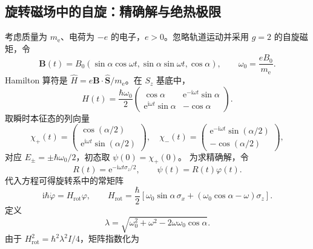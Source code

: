 \subsection{旋转磁场中的自旋：精确解与绝热极限}
考虑质量为 $m_{\mathrm e}$、电荷为 $-e$ 的电子，$e>0$。忽略轨道运动并采用 $g=2$ 的自旋磁矩，令
\begin{equation}
\bm B\left(t\right)=B_0\left(\sin\alpha\cos\omega t,\sin\alpha\sin\omega t,\cos\alpha\right),\qquad
\omega_0=\frac{eB_0}{m_{\mathrm e}}.
\end{equation}
Hamilton 算符是 $\hat H=e\bm B\cdot\hat{\bm S}/m_{\mathrm e}$。在 $S_z$ 基底中，
\begin{equation}
H\left(t\right)=\frac{\hbar\omega_0}{2}
\left(\begin{matrix}\cos\alpha&\mathrm{e}^{-\mathrm{i}\omega t}\sin\alpha\\
\mathrm{e}^{\mathrm{i}\omega t}\sin\alpha&-\cos\alpha\end{matrix}\right).
\end{equation}
取瞬时本征态的列向量
\begin{equation}
\chi_+\left(t\right)=\left(\begin{matrix}\cos\left(\alpha/2\right)\\
\mathrm{e}^{\mathrm{i}\omega t}\sin\left(\alpha/2\right)\end{matrix}\right),\quad
\chi_-\left(t\right)=\left(\begin{matrix}\mathrm{e}^{-\mathrm{i}\omega t}\sin\left(\alpha/2\right)\\
-\cos\left(\alpha/2\right)\end{matrix}\right),
\end{equation}
对应 $E_\pm=\pm\hbar\omega_0/2$，初态取 $\psi\left(0\right)=\chi_+\left(0\right)$。
为求精确解，令
\begin{equation}
R\left(t\right)=\mathrm{e}^{-\mathrm{i}\omega t\sigma_z/2},\qquad
\psi\left(t\right)=R\left(t\right)\varphi\left(t\right).
\end{equation}
代入方程可得旋转系中的常矩阵
\begin{equation}
\mathrm{i}\hbar\dot\varphi=H_{\mathrm{rot}}\varphi,\qquad
H_{\mathrm{rot}}=\frac\hbar2\left[\omega_0\sin\alpha\,\sigma_x+
\left(\omega_0\cos\alpha-\omega\right)\sigma_z\right].
\end{equation}
定义
\begin{equation}
\lambda=\sqrt{\omega_0^2+\omega^2-2\omega\omega_0\cos\alpha}.
\end{equation}
由于 $H_{\mathrm{rot}}^2=\hbar^2\lambda^2I/4$，矩阵指数化为
